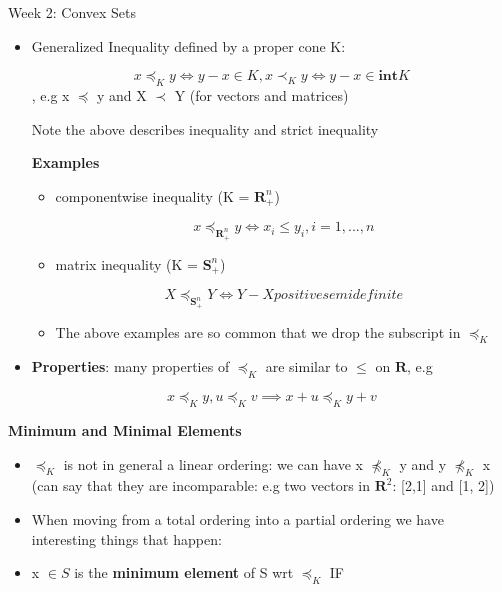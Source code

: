 \documentclass{article}
\begin{document}
\begin{homeworkProblemName}{{\LARGE Week 2: Convex Sets}}
\begin{problemAnswer}
{\begin{itemize}
       \item Generalized Inequality defined by a proper cone K:

         $$ x \preceq_K y \iff y - x \in K, x \prec_K y \iff y - x \in \textbf{int} K $$, e.g x $\preceq$
         y and X $\prec$ Y (for vectors and matrices)

         Note the above describes inequality and strict inequality

         \textbf{Examples}
         \begin{itemize}
         \item componentwise inequality (K = $\bm{R}^n_+$)

           $$ x \preceq_{\bm{R}^n_+} y \iff x_i \leq y_i, i= 1,...,n $$

         \item matrix inequality (K = $\bm{S}^n_+$)

           $$ X \preceq_{\bm{S}^n_+} Y \iff Y - X positive semidefinite $$

         \item The above examples are so common that we drop the subscript in $\preceq_K$
         \end{itemize}

       \item \textbf{Properties}: many properties of $\preceq_K$ are similar to $\leq$ on
         $\bm{R}$, e.g

         $$ x \preceq_K y, u \preceq_K v \implies x + u \preceq_K y + v $$
      \end{itemize}
    }\end{problemAnswer}


  \clearpage

  \vspace{0.2 cm} \textbf{{\large Minimum and Minimal Elements}}

  \begin{problemAnswer}{
      \begin{itemize}
      \item $\preceq_K$ is not in general a linear ordering: we can have x $\npreceq_K$ y and
        y $\npreceq_K$ x (can say that they are incomparable: e.g two vectors in
        $\bm{R}^2$: [2,1] and [1, 2])

      \item When moving from a total ordering into a partial ordering we have
        interesting things that happen:

      \item x $\in S$ is the \textbf{minimum element} of S wrt $\preceq_K$ IF


\end{itemize}}
\end{problemAnswer}
\end{homeworkProblemName}
\end{document}

